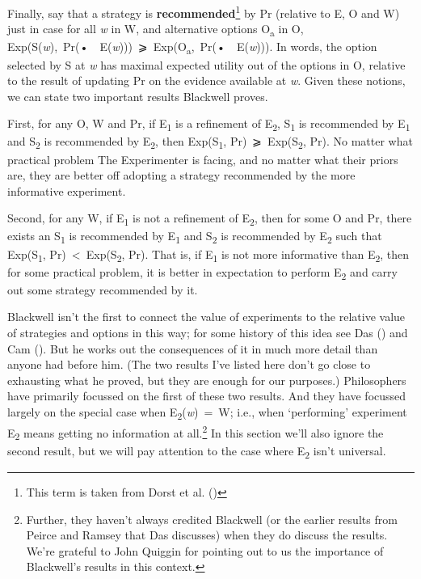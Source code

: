 \documentclass[
  10pt,
  letterpaper,
  DIV=11,
  numbers=noendperiod,
  twoside]{scrartcl}
\begin{document}
Finally, say that a strategy is \textbf{recommended}\footnote{This term
  is taken from Dorst et al. ()} by Pr
(relative to E, O and W) just in case for all \emph{w} in W, and
alternative options O\textsubscript{a} in O,
Exp(S(\emph{w}),~Pr(•~\textbar~E(\emph{w})))~⩾~Exp(O\textsubscript{a},~Pr(•~\textbar~E(\emph{w}))).
In words, the option selected by S at \emph{w} has maximal expected
utility out of the options in O, relative to the result of updating Pr
on the evidence available at \emph{w}. Given these notions, we can state
two important results Blackwell proves.

First, for any O, W and Pr, if E\textsubscript{1} is a refinement of
E\textsubscript{2}, S\textsubscript{1} is recommended by
E\textsubscript{1} and S\textsubscript{2} is recommended by
E\textsubscript{2}, then Exp(S\textsubscript{1},
Pr)~⩾~Exp(S\textsubscript{2}, Pr). No matter what practical problem The
Experimenter is facing, and no matter what their priors are, they are
better off adopting a strategy recommended by the more informative
experiment.

Second, for any W, if E\textsubscript{1} is not a refinement of
E\textsubscript{2}, then for some O and Pr, there exists an
S\textsubscript{1} is recommended by E\textsubscript{1} and
S\textsubscript{2} is recommended by E\textsubscript{2} such that
Exp(S\textsubscript{1}, Pr)~\textless~Exp(S\textsubscript{2}, Pr). That
is, if E\textsubscript{1} is not more informative than
E\textsubscript{2}, then for some practical problem, it is better in
expectation to perform E\textsubscript{2} and carry out some strategy
recommended by it.

Blackwell isn't the first to connect the value of experiments to the
relative value of strategies and options in this way; for some history
of this idea see Das () and Cam
(). But he works out the consequences of
it in much more detail than anyone had before him. (The two results I've
listed here don't go close to exhausting what he proved, but they are
enough for our purposes.) Philosophers have primarily focussed on the
first of these two results. And they have focussed largely on the
special case when E\textsubscript{2}(\emph{w})~=~W; i.e., when
`performing' experiment E\textsubscript{2} means getting no information
at all.\footnote{Further, they haven't always credited Blackwell (or the
  earlier results from Peirce and Ramsey that Das discusses) when they
  do discuss the results. We're grateful to John Quiggin for pointing
  out to us the importance of Blackwell's results in this context.} In
this section we'll also ignore the second result, but we will pay
attention to the case where E\textsubscript{2} isn't universal.
\end{document}
